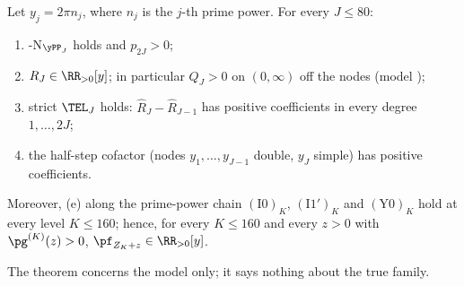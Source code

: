 \begin{theorem}\label{thm:PP80}
Let $y_j=2\pi n_j$, where $n_j$ is the $j$-th prime power. For every $J\le80$:
\begin{enumerate}[label=\textup{(\alph*)}]
\item \hyp{N}$_{\yPP_J}$ holds and $p_{2J}>0$;
\item $R_J\in\RR_{>0}[y]$; in particular $Q_J>0$ on $(0,\infty)$ off the nodes \textup{(}model \FRt\textup{)};
\item strict $\TEL_J$ holds: $\hat R_J-\hat R_{J-1}$ has positive coefficients in every degree $1,\dots,2J$;
\item the half-step cofactor \textup{(}nodes $y_1,\dots,y_{J-1}$ double, $y_J$ simple\textup{)} has positive
coefficients.
\end{enumerate}
Moreover, \textup{(e)} along the prime-power chain $(\mathrm{I0})_K$, $(\mathrm{I1}')_K$ and $(\mathrm Y0)_K$ hold at
every level $K\le160$; hence, for every $K\le160$ and every $z>0$ with $\pg^{(K)}(z)>0$, $\pf_{Z_K+z}\in\RR_{>0}[y]$.
\end{theorem}

The theorem concerns the model only; it says nothing about the true family.

